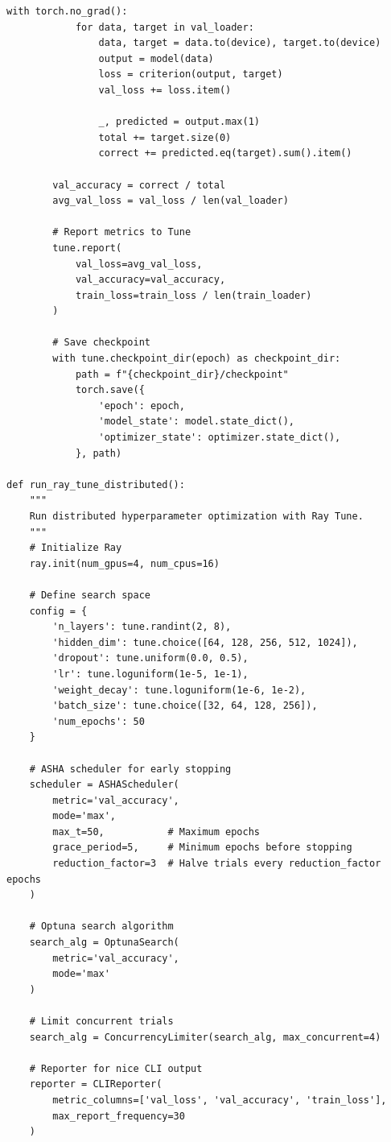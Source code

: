 \begin{lstlisting}[style=python, caption=Distributed HPO with Ray Tune]
        with torch.no_grad():
            for data, target in val_loader:
                data, target = data.to(device), target.to(device)
                output = model(data)
                loss = criterion(output, target)
                val_loss += loss.item()

                _, predicted = output.max(1)
                total += target.size(0)
                correct += predicted.eq(target).sum().item()

        val_accuracy = correct / total
        avg_val_loss = val_loss / len(val_loader)

        # Report metrics to Tune
        tune.report(
            val_loss=avg_val_loss,
            val_accuracy=val_accuracy,
            train_loss=train_loss / len(train_loader)
        )

        # Save checkpoint
        with tune.checkpoint_dir(epoch) as checkpoint_dir:
            path = f"{checkpoint_dir}/checkpoint"
            torch.save({
                'epoch': epoch,
                'model_state': model.state_dict(),
                'optimizer_state': optimizer.state_dict(),
            }, path)

def run_ray_tune_distributed():
    """
    Run distributed hyperparameter optimization with Ray Tune.
    """
    # Initialize Ray
    ray.init(num_gpus=4, num_cpus=16)

    # Define search space
    config = {
        'n_layers': tune.randint(2, 8),
        'hidden_dim': tune.choice([64, 128, 256, 512, 1024]),
        'dropout': tune.uniform(0.0, 0.5),
        'lr': tune.loguniform(1e-5, 1e-1),
        'weight_decay': tune.loguniform(1e-6, 1e-2),
        'batch_size': tune.choice([32, 64, 128, 256]),
        'num_epochs': 50
    }

    # ASHA scheduler for early stopping
    scheduler = ASHAScheduler(
        metric='val_accuracy',
        mode='max',
        max_t=50,           # Maximum epochs
        grace_period=5,     # Minimum epochs before stopping
        reduction_factor=3  # Halve trials every reduction_factor epochs
    )

    # Optuna search algorithm
    search_alg = OptunaSearch(
        metric='val_accuracy',
        mode='max'
    )

    # Limit concurrent trials
    search_alg = ConcurrencyLimiter(search_alg, max_concurrent=4)

    # Reporter for nice CLI output
    reporter = CLIReporter(
        metric_columns=['val_loss', 'val_accuracy', 'train_loss'],
        max_report_frequency=30
    )


\end{lstlisting}
